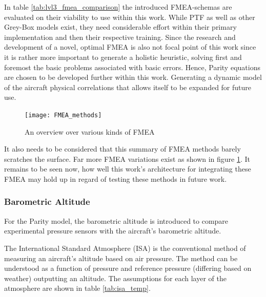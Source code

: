 In table \ref{tab:lvl3_fmea_comparison} the introduced FMEA-schemas are evaluated on their viability to use within this work. While PTF as well as other Grey-Box models exist, they need considerable effort within their primary implementation and then their respective training. Since the research and development of a novel, optimal FMEA is also not focal point of this work since it is rather more important to generate a holistic heuristic, solving first and foremost the basic problems associated with basic errors. Hence, Parity equations are chosen to be developed further within this work. Generating a dynamic model of the aircraft physical correlations that allows itself to be expanded for future use.


\begin{figure}
    \centering
    \texttt{[image: FMEA\_methods]}
    \caption{An overview over various kinds of FMEA \cite{zhang_bibliographical_2008}}
    \label{fig:FMEA-methods}
\end{figure}

It also needs to be considered that this summary of FMEA methods barely scratches the surface. Far more FMEA variations exist as shown in figure \ref{fig:FMEA-methods}. It remains to be seen now, how well this work's architecture for integrating these FMEA may hold up in regard of testing these methods in future work.

\subsubsection{Barometric Altitude}

For the Parity model, the barometric altitude is introduced to compare experimental pressure sensors with the aircraft's barometric altitude.

The International Standard Atmosphere (ISA) is the conventional method of measuring an aircraft's altitude based on air pressure. \cite{iso_standard_1975} The method can be understood as a function of pressure and reference pressure (differing based on weather) outputting an altitude. The assumptions for each layer of the atmosphere are shown in table \ref{tab:isa_temp}.

